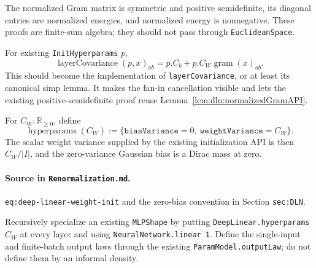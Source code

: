 \begin{lemma}
\label{lem:dln:normalizedGramAPI}
The normalized Gram matrix is symmetric and positive semidefinite, its diagonal entries are
normalized energies, and normalized energy is nonnegative.  These proofs are finite-sum algebra;
they should not pass through \texttt{EuclideanSpace}.
\end{lemma}

\begin{lemma}
\label{lem:dln:layerCovarianceGram}
For existing \texttt{InitHyperparams} $p$,
\[
 \operatorname{layerCovariance}(p,x)_{ab}
 =p.C_b+p.C_W\operatorname{gram}(x)_{ab}.
\]
This should become the implementation of \texttt{layerCovariance}, or at least its canonical simp
lemma.  It makes the fan-in cancellation visible and lets the existing positive-semidefinite proof
reuse Lemma~\ref{lem:dln:normalizedGramAPI}.
\end{lemma}

\begin{definition}
\label{def:dln:hyperparams}
For $C_W:\mathbb R_{\geq0}$, define
\[
 \operatorname{hyperparams}(C_W)
   :=\{\texttt{biasVariance}=0,\ \texttt{weightVariance}=C_W\}.
\]
The scalar weight variance supplied by the existing initialization API is then $C_W/|I|$, and the
zero-variance Gaussian bias is a Dirac mass at zero.

\paragraph{Source in \texttt{Renormalization.md}.}
\texttt{eq:deep-linear-weight-init} and the zero-bias convention in Section
\texttt{sec:DLN}.
\end{definition}

\begin{definition}
\label{def:dln:ensemble}
Recursively specialize an existing \texttt{MLPShape} by putting
\texttt{DeepLinear.hyperparams $C_W$} at every layer and using
\texttt{NeuralNetwork.linear 1}.  Define the single-input and finite-batch output laws through the
existing \texttt{ParamModel.outputLaw}; do not define them by an informal density.
\end{definition}

